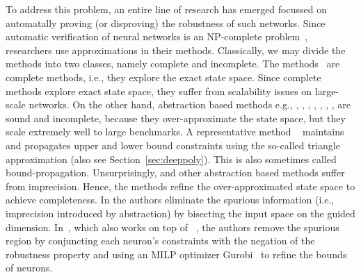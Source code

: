 To address this problem, an entire line of research has emerged focussed on automatally proving (or disproving) the robustness of such networks. Since automatic verification of neural networks is an NP-complete problem~\cite{katz2021reluplex}, researchers use approximations in their methods. Classically, we may divide the methods into two classes, namely complete and incomplete. The methods~\cite{lomuscio2017approach,fischetti2018deep,dutta2018output,cheng2017maximum,katz2017reluplex,katz2019marabou,ehlers2017formal,huang2017safety,wang2021beta,xu2020fast,zhang2022general} are complete methods, i.e., they explore the exact state space. Since complete methods explore exact state space, they suffer from scalability issues on large-scale networks. On the other hand, abstraction based methods e.g., \cite{dvijotham2018dual}, \cite{gehr2018ai2}, \cite{singh2018fast},  \cite{singh2018boosting}, \cite{weng2018towards}, \cite{wong2018provable}, \cite{zhang2018efficient}, \cite{zhang2018efficient} are sound and incomplete, because they over-approximate the state space, but they scale extremely well to large benchmarks. A representative method \deeppoly{}~\cite{singh2019abstract} maintains and propagates upper and lower bound constraints using the so-called triangle approximation (also see Section~\ref{sec:deeppoly}). This is also sometimes called bound-propagation. %
Unsurprisingly, \deeppoly{} and other abstraction based methods suffer from imprecision. Hence, the methods \cite{wang2018formal,wang2018efficient,elboher2020abstraction,yang2021improving,lin2020art} refine the over-approximated state space to achieve completeness. In \cite{wang2018formal,wang2018efficient,lin2020art} the authors eliminate the spurious information (i.e., imprecision introduced by abstraction) by bisecting the input space on the guided dimension. In~\cite{yang2021improving}, which also works on top of \deeppoly{}~\cite{singh2019abstract}, the authors remove the spurious region by  conjuncting each neuron's constraints with the negation of the robustness property and using an MILP optimizer Gurobi~\cite{gurobioptimizer} to refine the bounds of neurons. 

